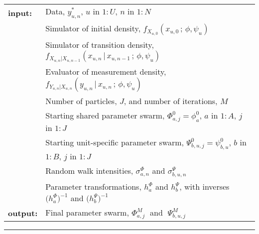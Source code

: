 \documentclass[12pt]{article}\usepackage[]{graphicx}\usepackage[table]{xcolor}
\newcommand\code{\texttt}
\newcommand\np{j}
\newcommand\unit{u} %
\renewcommand\time{n}
\newcommand\Nmif{M} %
\newcommand\Shared{\Phi}
\newcommand\Specific{\Psi}
\newcommand\shared{\phi}
\newcommand\specific{\psi}
\newcommand\nshared{a}
\newcommand\nspecific{b}
\newcommand\argequals{{\,=\,}}
\newcommand\given{{\, | \,}}
\newcommand\giventh{{\,;\,}}
\newcommand\seq[2]{{#1}\!:\!{#2}}
\begin{document}
\begin{algorithm}[t!]
  \caption{
    \texttt{mif2$\big($pp, Nmif{\argequals}$M$, Np{\argequals}$J$,
start{\argequals}$(\shared^0_{\nshared},\specific^0_{\nspecific,\unit})$,
rw\_sd{\argequals}$(\sigma^\Shared_{\nshared,\time},\sigma^\Specific_{\nspecific,\unit,\time})$,
cooling.factor.50{\argequals}$\rho^{50}\big)$}, where \code{pp} is a \code{panelPomp} object containing data and defined \code{rprocess}, \code{dmeasure}, \code{rinit} and \code{partrans} components.
    \label{alg:pif}
    }
\noindent\begin{tabular}{ll}
{\bf input:}\rule[-1.5mm]{0mm}{6mm}
& Data, $y_{\unit,n}^*$, $u$ in $\seq{1}{U}$, $n$ in $\seq{1}{N}$\\
& Simulator of initial density, $f_{X_{\unit,0}}(x_{\unit,0}\giventh \shared,\specific_{\unit})$ \\
& Simulator of transition density, $f_{X_{\unit,n}|X_{\unit,n-1}}(x_{\unit,n}\given x_{\unit,n-1}\giventh \shared,\specific_{\unit})$ \\
& Evaluator of measurement density, $f_{Y_{\unit,n}|X_{\unit,n}}(y_{\unit,n}\given x_{\unit,n}\giventh\shared,\specific_{\unit})$ \\
& Number of particles, $J$, and number of iterations, $\Nmif$\\
& Starting shared parameter swarm, $\Shared^0_{\nshared,\np}=\shared^0_{\nshared}$, $a$ in $\seq{1}{A}$, $j$ in $\seq{1}{J}$\\
& Starting unit-specific parameter swarm, $\Specific^0_{\nspecific,\unit,\np}=\specific^0_{\nspecific,\unit}$,  $b$ in  $\seq{1}{B}$, $j$ in $\seq{1}{J}$\\
& Random walk intensities,
$\sigma^\Shared_{\nshared,\time}$ and $\sigma^\Specific_{\nspecific,\unit,\time}$ \\
& Parameter transformations, $h^{\Shared}_{\nshared}$ and $h^{\Specific}_{\nspecific}$, with inverses
 $\big(h^{\Shared}_{\nshared}\big)^{-1}$ and $\big(h^{\Specific}_{\nspecific}\big)^{-1}$
\\
{\bf output:}\rule[-1.5mm]{0mm}{6mm}
& Final parameter swarm, $\Shared^M_{\nshared,\np}\;$ and $\;\Specific^M_{\nspecific,\unit,\np}$
\rule[-2mm]{0mm}{5mm}
\end{tabular}

\hrule


\end{algorithm}
\end{document}

